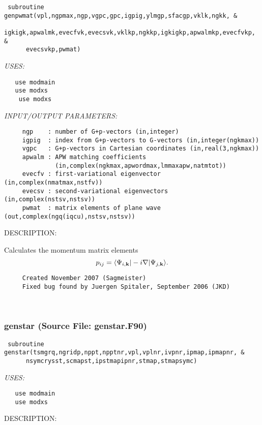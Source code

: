 \documentclass[11pt]{article}
\begin{document}
\begin{verbatim} subroutine genpwmat(vpl,ngpmax,ngp,vgpc,gpc,igpig,ylmgp,sfacgp,vklk,ngkk, &
      igkigk,apwalmk,evecfvk,evecsvk,vklkp,ngkkp,igkigkp,apwalmkp,evecfvkp, &
      evecsvkp,pwmat)\end{verbatim}{\em USES:}
\begin{verbatim}   use modmain
   use modxs
    use modxs\end{verbatim}{\em INPUT/OUTPUT PARAMETERS:}
\begin{verbatim}     ngp    : number of G+p-vectors (in,integer)
     igpig  : index from G+p-vectors to G-vectors (in,integer(ngkmax))
     vgpc   : G+p-vectors in Cartesian coordinates (in,real(3,ngkmax))
     apwalm : APW matching coefficients
              (in,complex(ngkmax,apwordmax,lmmaxapw,natmtot))
     evecfv : first-variational eigenvector (in,complex(nmatmax,nstfv))
     evecsv : second-variational eigenvectors (in,complex(nstsv,nstsv))
     pwmat  : matrix elements of plane wave (out,complex(ngq(iqcu),nstsv,nstsv))\end{verbatim}
{\sf DESCRIPTION:\\ }


     Calculates the momentum matrix elements
     $$ p_{ij}=\langle\Psi_{i,{\bf k}}|-i\nabla|\Psi_{j,{\bf k}}\rangle. $$
  
\begin{verbatim}     Created November 2007 (Sagmeister)
     Fixed bug found by Juergen Spitaler, September 2006 (JKD)\end{verbatim}






 
 
\mbox{}\hrulefill\ 
 
\subsubsection{genstar (Source File: genstar.F90)}


\begin{verbatim} subroutine genstar(tsmgrq,ngridp,nppt,npptnr,vpl,vplnr,ivpnr,ipmap,ipmapnr, &
      nsymcrysst,scmapst,ipstmapipnr,stmap,stmapsymc)\end{verbatim}{\em USES:}
\begin{verbatim}   use modmain
   use modxs\end{verbatim}
{\sf DESCRIPTION:\\ }
\end{document}
